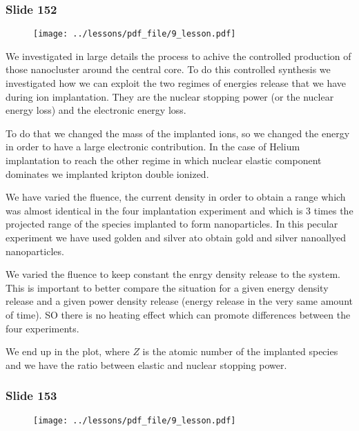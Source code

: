 \documentclass[../main/main.tex]{subfiles}
\begin{document}
\newpage

\subsubsection{Slide 152}

\begin{figure}[h!]
\centering
\texttt{[image: ../lessons/pdf\_file/9\_lesson.pdf]}
\end{figure}

We investigated in large details the process to achive the controlled production of those nanocluster around the central core. To do this controlled synthesis we investigated how we can exploit the two regimes of energies release that we have during ion implantation. They are the nuclear stopping power (or the nuclear energy loss) and the electronic energy loss.

To do that we changed the mass of the implanted ions, so we changed the energy in order to have a large electronic contribution. In the case of Helium implantation to reach the other regime in which nuclear elastic component dominates we implanted kripton double ionized.

We have varied the fluence, the current density in order to obtain a range which was almost identical in the four implantation experiment and which is 3 times the projected range of the species implanted to form nanoparticles.
In this pecular experiment we have used golden and silver ato obtain gold and silver nanoallyed nanoparticles.

We varied the fluence to keep constant the enrgy density release to the system. This is important to better compare the situation for a given energy density release and a given power density release (energy release in the very same amount of time). SO there is no heating effect which can promote differences between the four experiments.

We end up in the plot, where \( Z \) is the atomic number of the implanted species and we have the ratio between elastic and nuclear stopping power.

\newpage

\subsubsection{Slide 153}

\begin{figure}[h!]
\centering
\texttt{[image: ../lessons/pdf\_file/9\_lesson.pdf]}
\end{figure}
\end{document}
